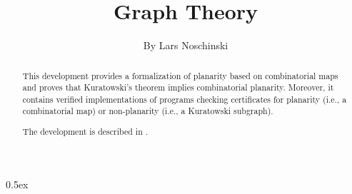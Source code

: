 \documentclass[11pt,a4paper]{article}
\begin{document}
\title{Graph Theory}
\author{By Lars Noschinski}
\maketitle

\begin{abstract}
This development provides a formalization of planarity based on combinatorial maps and proves that Kuratowski's theorem implies combinatorial planarity.
Moreover, it contains verified implementations of programs checking certificates for planarity (i.e., a combinatorial map) or non-planarity (i.e., a Kuratowski subgraph).

The development is described in \cite{noschinski_formalizing_2015}.
\end{abstract}


\tableofcontents

\parindent 0pt\parskip 0.5ex





\end{document}
